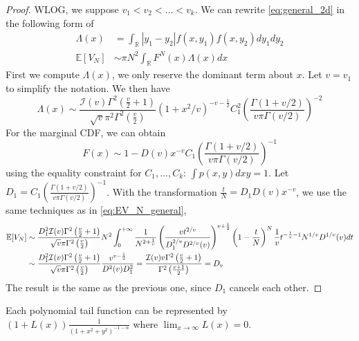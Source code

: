 \documentclass{article}
\def\E{\mathbb{E}}
\def\R{\mathbb{R}}
\begin{document}
\begin{proof}
    WLOG, we suppose $v_1 < v_2 < \dots < v_k$.
    We can rewrite \eqref{eq:general_2d}
    in the following form of
    \begin{align}
        \Lambda(x) &= \int_{\R} |y_1-y_2| f(x, y_1) f(x,y_2)
        dy_1dy_2
        \\
        \E[V_N]
        &\sim \pi N^2 \int_{\R} F^{N}(x) \Lambda(x)dx
    \end{align}
    First we compute $\Lambda(x)$,
    we only reserve the dominant term about $x$.
    Let $v=v_1$ to simplify the notation.
    We then have
    \begin{equation}
        \Lambda(x) \sim \frac{ \mathcal{I}(v)\Gamma^2 \left(\frac{v}{2} +1\right) }
        {\sqrt{v}\pi^2
        \Gamma^2\left(\frac{v}{2}\right)} (1+x^2/v)^{-v-\frac{1}{2}} C^2_1
         \left( \frac{\Gamma(1+v/2)}
         {v\pi \Gamma(v/2)}
         \right)^{-2}
    \end{equation}
    For the marginal CDF, we can obtain
    $$
    F(x) \sim 1 - D(v)x^{-v} C_1
    \left( \frac{\Gamma(1+v/2)}
         {v\pi \Gamma(v/2)}
         \right)^{-1}
    $$
    using
    the equality constraint for
    $C_1, \dots, C_k$:
    $\int p(x,y)dxy=1$.
    Let $D_1 = C_1\left( \frac{\Gamma(1+v/2)}
    {v\pi \Gamma(v/2)}
    \right)^{-1} $.
    With the transformation
    $\frac{t}{N}=D_1D(v)x^{-v}$,
    we use the same techniques
    as in \eqref{eq:EV_N_general},
    \begin{align}
        \E[V_N] &\sim
        \frac{ D_1^2\mathcal{I}(v)
        \Gamma^2 \left(\frac{v}{2} +1\right) }
        {\sqrt{v}\pi
        \Gamma^2\left(\frac{v}{2}\right)}  N^2
        \int_{0}^{+\infty} \frac{1}
        {N^{2+\frac{1}{v}}}
        \left(\frac{v t^{2/v}}{D_1^{2/v}D^{2/v}(v)}\right)^{v+\frac{1}{2}}
        \left(1- \frac{t}{N} \right)^N \frac{1}{v} t^{-\frac{1}{v}-1} N^{1/v} D^{1/v}(v)dt
        \notag \\
        &\sim \frac{ D_1^2\mathcal{I}(v)
        \Gamma^2 \left(\frac{v}{2} +1\right) }
        {\sqrt{v}\pi
        \Gamma^2\left(\frac{v}{2}\right)} \frac{v^{v-\frac{1}{2}}}
        {D^2(v)D_1^2} = \frac{\mathcal{I}(v) v \Gamma^2\left(\frac{v}{2}+1\right)}
        {\Gamma^2 \left(\frac{v+1}{2} \right)} = D_{v}\notag
    \end{align}
    The result is the same as the previous one, since
    $D_1$ cancels each other.
\end{proof}

Each polynomial tail function can be represented
by $(1+L(x)) \frac{1}{(1+x^2+y^2)^{-1-\alpha}}$
where $\lim_{x\to \infty} L(x) = 0$.
\end{document}

